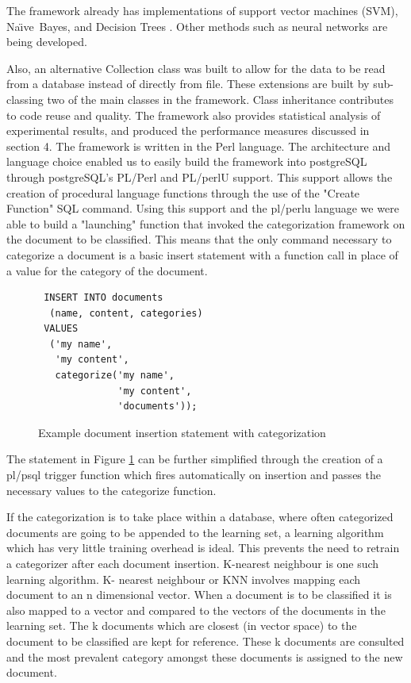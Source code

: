 \documentclass[twocolumn]{article}
\newcommand{\naive}{Na\"\i ve}
\begin{document}
The framework already has implementations of support vector machines (SVM), 
\naive\ Bayes, and Decision Trees \cite{yang:99, sebastiani:02}. Other methods such 
as neural networks \cite{calvo:00, calvo:01} are being developed.

Also, an alternative Collection class was built to allow for the data to be read from a 
database instead of directly from file. These extensions are built by sub-classing two 
of the main classes in the framework. Class inheritance contributes to code reuse and 
quality. The framework also provides statistical analysis of experimental results, and 
produced the performance measures discussed in section 4. The framework is written 
in the Perl language. The architecture and language choice enabled us to easily build the 
framework into postgreSQL through postgreSQL's PL/Perl and PL/perlU support. 
This support allows the creation of procedural language functions through the use of 
the "Create Function" SQL command. Using this support and the pl/perlu language 
we were able to build a "launching" function that invoked the categorization 
framework on the document to be classified. This means that the only command 
necessary to categorize a document is a basic insert statement with a function call in 
place of a value for the category of the document.

\begin{figure}
\begin{verbatim}
 INSERT INTO documents
  (name, content, categories) 
 VALUES
  ('my name',
   'my content',
   categorize('my name',
              'my content',
              'documents'));
\end{verbatim}
\caption{Example document insertion statement with categorization}
\label{sql-insert}
\end{figure}

The statement in Figure \ref{sql-insert} can be further simplified through the creation of a pl/psql 
trigger function which fires automatically on insertion and passes the necessary values 
to the categorize function. 

If the categorization is to take place within a database, where often categorized 
documents are going to be appended to the learning set, a learning algorithm which has 
very little training overhead is ideal. This prevents the need to retrain a categorizer 
after each document insertion. K-nearest neighbour is one such learning algorithm. K-
nearest neighbour or KNN involves mapping each document to an n dimensional 
vector. When a document is to be classified it is also mapped to a vector and 
compared to the vectors of the documents in the learning set. The k documents which 
are closest (in vector space) to the document to be classified are kept for reference. 
These k documents are consulted and the most prevalent category amongst these 
documents is assigned to the new document. 
\end{document}
